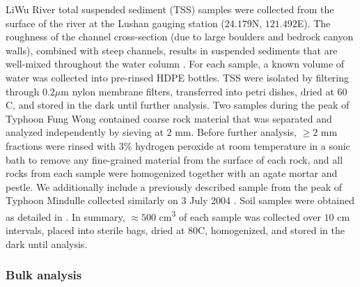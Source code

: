 LiWu River total suspended sediment (TSS) samples were collected from the surface of the river at the Lushan gauging station ($24.179$\textdegree N, $121.492$\textdegree E). The roughness of the channel cross-section (due to large boulders and bedrock canyon walls), combined with steep channels, results in suspended sediments that are well-mixed throughout the water column \citep{Turowski:2008iz}. For each sample, a known volume of water was collected into pre-rinsed HDPE bottles. TSS were isolated by filtering through $0.2\mu$m nylon membrane filters, transferred into petri dishes, dried at $60$\textdegree C, and stored in the dark until further analysis. Two samples during the peak of Typhoon Fung Wong contained coarse rock material that was separated and analyzed independently by sieving at $2$ mm. Before further analysis, $\geq 2$ mm fractions were rinsed with $3$\% hydrogen peroxide at room temperature in a sonic bath to remove any fine-grained material from the surface of each rock, and all rocks from each sample were homogenized together with an agate mortar and pestle. We additionally include a previously described sample from the peak of Typhoon Mindulle collected similarly on 3 July 2004 \citep{Hilton:2008fo,Hilton:2010cg}. Soil samples were obtained as detailed in \citet{Hilton:2013kq}. In summary, $\approx 500$ cm\textsuperscript{3} of each sample was collected over $10$ cm intervals, placed into sterile bags, dried at $80$\textdegree C, homogenized, and stored in the dark until analysis.

\subsubsection{Bulk analysis}

